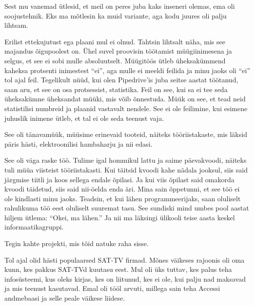 
Sest mu vanemad ütlesid, et meil on peres juba kaks inseneri olemas, ema oli 
soojustehnik. Eks ma mõtlesin ka muid variante, aga kodu juures 
oli palju lihtsam. 


Erilist ettekujutust ega plaani mul ei olnud. Tahtsin lihtsalt näha, mis see majandus 
õigupoolest on. Ühel suvel proovisin töötamist müügiinimesena ja selgus, et 
see ei sobi mulle absoluutselt. Müügitöös ütleb 
üheksakümmend kaheksa protsenti inimestest \enquote{ei}, aga mulle ei 
meeldi feilida ja minu jaoks oli \enquote{ei} tol ajal feil. 
Tegelikult nüüd, kui olen Pipedrive'is juba seitse 
aastat töötanud, saan aru, et see on osa protsessist, statistika. Feil on see, kui sa ei tee seda üheksakümne üheksandat 
müüki, mis võib õnnestuda. Müük on see, et tead neid statistilisi 
numbreid ja plaanid vastavalt nendele. See ei ole feilimine, kui esimene juhuslik 
inimene ütleb, et tal ei ole seda teenust vaja.


See oli tänavamüük, müüsime erinevaid tooteid, näiteks 
tööriistakaste, mis läksid päris hästi, 
elektroonilisi hambaharju ja nii edasi.


See oli väga raske töö. Tulime igal hommikul lattu ja saime päevakvoodi, näiteks tuli müüa viisteist 
tööriistakasti. Kui täitsid kvoodi kahe nädala jooksul, siis 
said järgmise tiitli ja koos sellega endale õpilasi. Ja kui viis 
õpilast said omakorda kvoodi täidetud, siis said 
nii-öelda enda äri. Mina sain õppetunni, et see töö ei ole kindlasti minu 
jaoks. Teadsin, et kui lähen programmeerijaks, saan oluliselt 
rahulikuma töö eest oluliselt suuremat tasu. See sundiski mind umbes 
pool aastat hiljem ütlema: \enquote{Okei, ma lähen.} Ja nii ma läksingi ülikooli 
teise aasta keskel informaatikagruppi.


Tegin kahte projekti, mis tõid natuke raha sisse.

Tol ajal olid hästi populaarsed 
SAT-TV firmad. Mõnes 
väikeses rajoonis oli oma kunn, kes pakkus SAT-TVd kuutasu eest. 
Mul oli üks tuttav, kes palus teha infosüsteemi, kus oleks kirjas, kes on 
liitunud, kes ei ole, kui palju nad maksavad ja mis teenust kasutavad. 
Emal oli tööl arvuti, millega sain teha Accessi andmebaasi ja selle peale väikese liidese.

